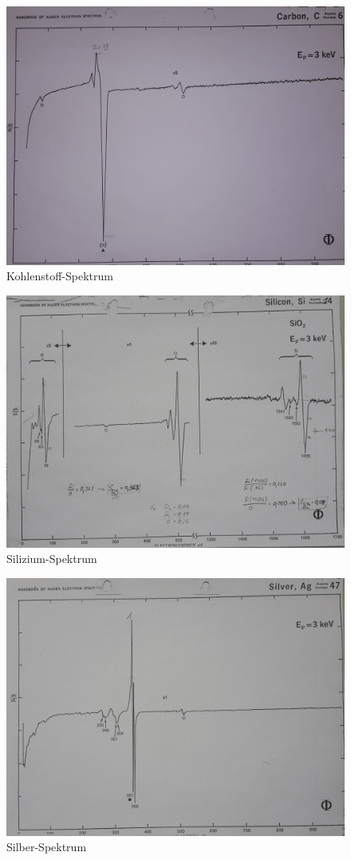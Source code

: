 \documentclass[12pt, oneside, a4paper]{article}
\begin{document}
			\begin{figure}[H]
				\center
				\includegraphics[scale=0.15]{c-spektrum.jpg}
				\caption{Kohlenstoff-Spektrum}
			\end{figure}

			\begin{figure}[H]
				\center
				\includegraphics[scale=0.15]{si-spektrum.jpg}
				\caption{Silizium-Spektrum}
			\end{figure}

			\begin{figure}[H]
				\center
				\includegraphics[scale=0.15]{ag-spektrum.jpg}
				\caption{Silber-Spektrum}
			\end{figure}


	
\end{document}
